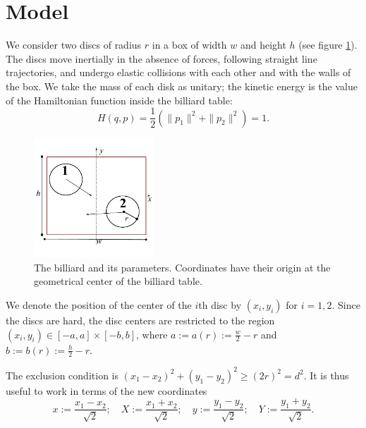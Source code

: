 \documentclass[letterpaper,10pt, jcp, aps]{revtex4-1}
\newcommand{\defeq}{:=}
\begin{document}
\section{Model}


We consider two discs of radius $r$  %
in a box of width $w$ and height $h$ (see figure \ref{billar01}). 
The discs move inertially in the absence of forces, 
following straight line trajectories,
and undergo elastic collisions with each 
other and with the walls of the box.
We take the mass of each disk as unitary; the kinetic energy
is the value of the Hamiltonian function inside the billiard table:
\begin{equation}
H(q,p)=\frac{1}{2}(\|p_1\|^2+\|p_2\|^2)=1.
\end{equation}

\begin{figure}[h]
  \begin{center}
  \includegraphics[width=0.40\textwidth]{FigurasPerfectas/DiscosenCajaCuadrada01.pdf}
  \end{center}
  \caption{The billiard and its parameters. Coordinates
    have their origin at the geometrical center of the 
    billiard table.}\label{billar01}
\end{figure}

We denote the position of the center of the $i$th disc by 
$(x_{i}, y_{i})$ for $i=1,2$. Since the discs are hard, 
the disc centers are restricted to the region 
$(x_i, y_i) \in [-a,a] \times [-b, b]$, where 
$a \defeq a(r) \defeq \frac{w}{2} - r $ and
$b \defeq b(r) \defeq \frac{h}{2} - r $.


The exclusion condition is $(x_1-x_2)^2 + (y_1-y_2)^2 \ge (2r)^2 = d^2$.
It is thus useful to work in terms of the new coordinates
\begin{equation}\label{cambiocoor01}
 x \defeq \frac{x_1 - x_2}{\sqrt{2}}; 
\quad X \defeq \frac{x_1 + x_2}{\sqrt{2}}; 
\quad y \defeq \frac{y_1 - y_2}{\sqrt{2}}; 
\quad Y \defeq \frac{y_1 + y_2}{\sqrt{2}}.
\end{equation}
\end{document}
